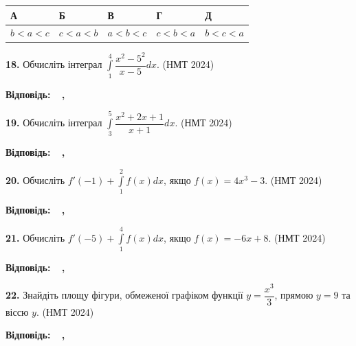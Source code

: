 \documentclass[14pt]{extarticle}
\newcommand{\answerTable}[5]{
\begin{center}
\begin{tabular}{|*{5}{>{\centering\arraybackslash}m{3cm}|}}
\hline
\rule[-0.3cm]{0pt}{0.8cm}\textbf{А} & \textbf{Б} & \textbf{В} & \textbf{Г} & \textbf{Д} \\
\hline
\rule[-0.4cm]{0pt}{1.0cm}#1 & \rule[-0.4cm]{0pt}{1.0cm}#2 & \rule[-0.4cm]{0pt}{1.0cm}#3 & \rule[-0.4cm]{0pt}{1.0cm}#4 & \rule[-0.4cm]{0pt}{1.0cm}#5 \\
\hline
\end{tabular}
\end{center}
}
\newcommand{\answerBox}{
    \noindent
    \textbf{Відповідь:} \quad
    \begingroup
    \setlength{\fboxsep}{8pt}
    \framebox{\phantom{0}}\,\framebox{\phantom{0}}\,\framebox{\phantom{0}}\,\framebox{\phantom{0}}
    \textbf{,}
    \framebox{\phantom{0}}\,\framebox{\phantom{0}}\,\framebox{\phantom{0}}
    \endgroup
}
\newcommand{\nmtyear}[1]{\hfill{\small\color{yearcolor}(НМТ #1)}}
\begin{document}
\vspace{0.3cm}
\answerTable{$b < a < c$}{$c < a < b$}{$a < b < c$}{$c < b < a$}{$b < c < a$}

\vspace{0.7cm}

\noindent\textbf{18.} Обчисліть інтеграл $\displaystyle\int\limits_{1}^{4} \dfrac{x^2 - 5^2}{x - 5} dx$. \nmtyear{2024}

\vspace{0.5cm}
\answerBox

\vspace{1.0cm}

\noindent\textbf{19.} Обчисліть інтеграл $\displaystyle\int\limits_{3}^{5} \dfrac{x^2 + 2x + 1}{x + 1} dx$. \nmtyear{2024}

\vspace{0.5cm}
\answerBox

\vspace{1.0cm}

\noindent\textbf{20.} Обчисліть $f'(-1) + \displaystyle\int\limits_{1}^{2} f(x) dx$, якщо $f(x) = 4x^3 - 3$. \nmtyear{2024}

\vspace{0.5cm}
\answerBox

\vspace{1.0cm}

\noindent\textbf{21.} Обчисліть $f'(-5) + \displaystyle\int\limits_{1}^{4} f(x) dx$, якщо $f(x) = -6x + 8$. \nmtyear{2024}

\vspace{0.5cm}
\answerBox

\vspace{1.0cm}

\noindent\textbf{22.} Знайдіть площу фігури, обмеженої графіком функції $y = \dfrac{x^3}{3}$, прямою $y = 9$ та віссю $y$. \nmtyear{2024}

\vspace{0.5cm}
\answerBox

\vspace{1.0cm}
\end{document}
